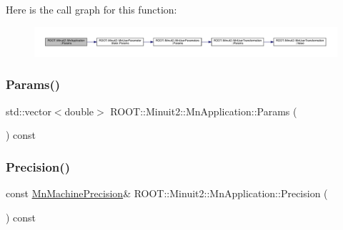 Here is the call graph for this function\+:
\nopagebreak
\begin{figure}[H]
\begin{center}
\leavevmode
\includegraphics[width=350pt]{df/dd5/classROOT_1_1Minuit2_1_1MnApplication_ad4a7808d299103c748b01bd9c2f5b91d_cgraph}
\end{center}
\end{figure}
\mbox{\label{classROOT_1_1Minuit2_1_1MnApplication_ae821bfc8bb4659bd3b01835c1d58387c}} 
\subsubsection{\texorpdfstring{Params()}{Params()}\hspace{0.1cm}{\footnotesize\ttfamily [3/3]}}
{\footnotesize\ttfamily std\+::vector$<$double$>$ R\+O\+O\+T\+::\+Minuit2\+::\+Mn\+Application\+::\+Params (\begin{DoxyParamCaption}{ }\end{DoxyParamCaption}) const}

\mbox{\label{classROOT_1_1Minuit2_1_1MnApplication_a8de6eb3be52721cec183ba830504e7bc}} 
\subsubsection{\texorpdfstring{Precision()}{Precision()}\hspace{0.1cm}{\footnotesize\ttfamily [1/3]}}
{\footnotesize\ttfamily const \mbox{\hyperlink{classROOT_1_1Minuit2_1_1MnMachinePrecision}{Mn\+Machine\+Precision}}\& R\+O\+O\+T\+::\+Minuit2\+::\+Mn\+Application\+::\+Precision (\begin{DoxyParamCaption}{ }\end{DoxyParamCaption}) const\hspace{0.3cm}{\ttfamily [inline]}}

